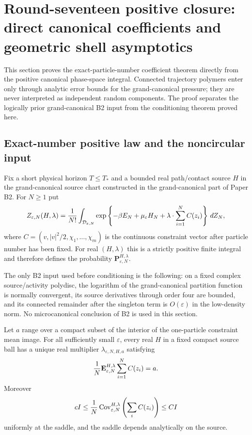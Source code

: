 \section{Round-seventeen positive closure: direct canonical coefficients and geometric shell asymptotics}
\label{sec:r17-b1}

This section proves the exact-particle-number coefficient theorem directly
from the positive canonical phase-space integral.  Connected trajectory
polymers enter only through analytic error bounds for the grand-canonical
pressure; they are never interpreted as independent random components.  The
proof separates the logically prior grand-canonical B2 input from the
conditioning theorem proved here.

\subsection{Exact-number positive law and the noncircular input}

Fix a short physical horizon $T\le T_*$ and a bounded real path/contact source
$H$ in the grand-canonical source chart constructed in the grand-canonical
part of Paper B2.  For $N\ge1$ put
\[
 Z_{\varepsilon,N}(H,\lambda)
 ={1\over N!}\int_{\mathcal D_{\varepsilon,N}}
 \exp\left\{-\beta E_N+\mu_\varepsilon H_N
 +\lambda\cdot\sum_{i=1}^N C(z_i)\right\}\,dZ_N,
\]
where $C=(v,|v|^2/2,\chi_1,\ldots,\chi_m)$ is the continuous
constraint vector after particle number has been fixed.  For real
$(H,\lambda)$ this is a strictly positive finite integral and therefore
defines the probability $\mathbf P_{\varepsilon,N}^{H,\lambda}$.

The only B2 input used before conditioning is the following: on a fixed
complex source/activity polydisc, the logarithm of the grand-canonical
partition function is normally convergent, its source derivatives through
order four are bounded, and its connected remainder after the singleton term
is $O(\varepsilon)$ in the low-density norm.  No microcanonical conclusion of
B2 is used in this section.

\begin{lemma}
\label{lem:r17-b1-saddle}
Let $a$ range over a compact subset of the interior of the one-particle
constraint mean image.  For all sufficiently small $\varepsilon$, every real
$H$ in a fixed compact source ball has a unique real multiplier
$\lambda_{\varepsilon,N,H,a}$ satisfying
\[
 {1\over N}\mathbf E_{\varepsilon,N}^{H,\lambda}
 \sum_{i=1}^NC(z_i)=a.
\]
Moreover
\[
 cI\le {1\over N}\operatorname{Cov}_{\varepsilon,N}^{H,\lambda}
 \left(\sum_iC(z_i)\right)\le CI
\]
uniformly at the saddle, and the saddle depends analytically on the source.
\end{lemma}


